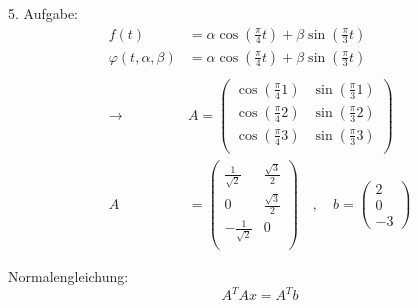 5. Aufgabe:
\begin{equation}\begin{split}
f(t) &= \alpha \cos\left(\frac{\pi}{4}t\right) + \beta \sin\left(\frac{\pi}{3}t\right) \\
\varphi(t, \alpha, \beta) &= \alpha \cos\left(\frac{\pi}{4}t\right) + \beta \sin\left(\frac{\pi}{3}t\right)\\\\
\rightarrow & 
A = 
\begin{pmatrix*}
\cos\left(\frac{\pi}{4}1\right) & \sin\left(\frac{\pi}{3}1\right)\\
\cos\left(\frac{\pi}{4}2\right) & \sin\left(\frac{\pi}{3}2\right)\\
\cos\left(\frac{\pi}{4}3\right) & \sin\left(\frac{\pi}{3}3\right)\\		
\end{pmatrix*}\\
A &= 
\begin{pmatrix*}
\frac{1}{\sqrt{2}}  & \frac{\sqrt{3}}{2}\\
0                   & \frac{\sqrt{3}}{2}\\
-\frac{1}{\sqrt{2}} & 0\\		
\end{pmatrix*}
\quad, \quad
b = 
\begin{pmatrix*}
2\\
0\\
-3
\end{pmatrix*}
\end{split}\end{equation}

Normalengleichung:
\[
	A^T A x = A^T b
\]

